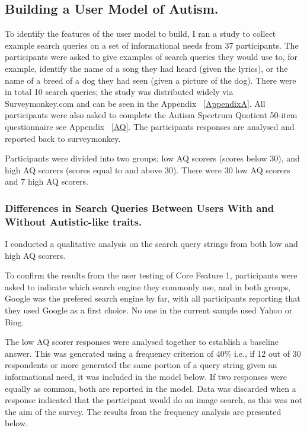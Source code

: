 \documentclass[a4paper, 11pt]{article}
\begin{document}
\subsection{Building a User Model of Autism.}
To identify the features of the user model to build, I ran a study to collect example search queries on a set of informational needs from 37 participants. The participants were asked to give examples of search queries they would use to, for example, identify the name of a song they had heard (given the lyrics), or the name of a breed of a dog they had seen (given a picture of the dog). There were in total 10 search queries; the study was distributed widely via Surveymonkey.com \cite{surveymonkey} and can be seen in the Appendix ~\ref{AppendixA}. All participants were also asked to complete the Autism Spectrum Quotient 50-item questionnaire see Appendix ~\ref{AQ}. The participants responses are analysed and reported back to surveymonkey.


\vspace{5mm}
Participants were divided into two groups; low AQ scorers (scores below 30), and high AQ scorers (scores equal to and above 30). There were 30 low AQ scorers and 7 high AQ scorers. 


\subsubsection{Differences in Search Queries Between Users With and Without Autistic-like traits.}
I conducted a qualitative analysis on the search query strings from both low and high AQ scorers.

\vspace{5mm}
To confirm the results from the user testing of Core Feature 1, participants were asked to indicate which search engine they commonly use, and in both groups, Google was the prefered search engine by far, with all participants reporting that they used Google as a first choice. No one in the current sample used Yahoo or Bing.

\vspace{5mm} 
The low AQ scorer responses were analysed together to establish a baseline answer. This was generated using a frequency criterion of 40\% i.e., if 12 out of 30 respondents or more generated the same portion of a query string given an informational need, it was included in the model below. If two responses were equally as common, both are reported in the model. Data was discarded when a response indicated that the participant would do an image search, as this was not the aim of the survey. The results from the frequency analysis are presented below.
\end{document}
